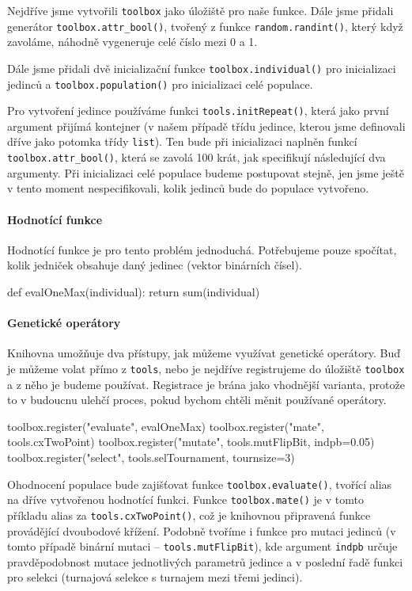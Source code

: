 Nejdříve jsme vytvořili \texttt{toolbox} jako úložiště pro naše funkce. Dále
jsme přidali generátor \texttt{toolbox.attr\_bool()}, tvořený z funkce
\texttt{random.randint()}, který když zavoláme, náhodně vygeneruje celé číslo
mezi 0 a 1.

Dále jsme přidali dvě inicializační funkce \texttt{toolbox.individual()} pro
inicializaci jedinců a \texttt{toolbox.population()} pro inicializaci celé
populace. 

Pro vytvoření jedince používáme funkci \texttt{tools.initRepeat()}, která jako
první argument přijímá kontejner (v našem případě třídu jedince, kterou jsme
definovali dříve jako potomka třídy \texttt{list}). Ten bude při inicializaci
naplněn funkcí \texttt{toolbox.attr\_bool()}, která se zavolá 100 krát, jak
specifikují následující dva argumenty. Při inicializaci celé populace budeme
postupovat stejně, jen jsme ještě v tento moment nespecifikovali, kolik jedinců
bude do populace vytvořeno.

\paragraph{Hodnotící funkce}
Hodnotící funkce je pro tento problém jednoduchá. Potřebujeme pouze spočítat,
kolik jedniček obsahuje daný jedinec (vektor binárních čísel).

\begin{code}
def evalOneMax(individual):
    return sum(individual)
\end{code}

\paragraph{Genetické operátory}
Knihovna umožňuje dva přístupy, jak můžeme využívat genetické operátory. Buď je
můžeme volat přímo z \texttt{tools}, nebo je nejdříve registrujeme do úložiště
\texttt{toolbox} a z něho je budeme používat. Registrace je brána jako
vhodnější varianta, protože to v budoucnu ulehčí proces, pokud bychom chtěli
měnit používané operátory.

\begin{code}
toolbox.register("evaluate", evalOneMax)
toolbox.register("mate", tools.cxTwoPoint)
toolbox.register("mutate", tools.mutFlipBit, indpb=0.05)
toolbox.register("select", tools.selTournament, tournsize=3)
\end{code}

Ohodnocení populace bude zajišťovat funkce \texttt{toolbox.evaluate()}, tvořící
alias na dříve vytvořenou hodnotící funkci. Funkce \texttt{toolbox.mate()} je v
tomto příkladu alias za \texttt{tools.cxTwoPoint()}, což je knihovnou
připravená funkce provádějící dvoubodové křížení. Podobně tvoříme i funkce pro
mutaci jedinců (v tomto případě binární mutaci -- \texttt{tools.mutFlipBit}),
kde argument \texttt{indpb} určuje pravděpodobnost mutace jednotlivých
parametrů jedince a v poslední řadě funkci pro selekci (turnajová selekce s
turnajem mezi třemi jedinci).
        
